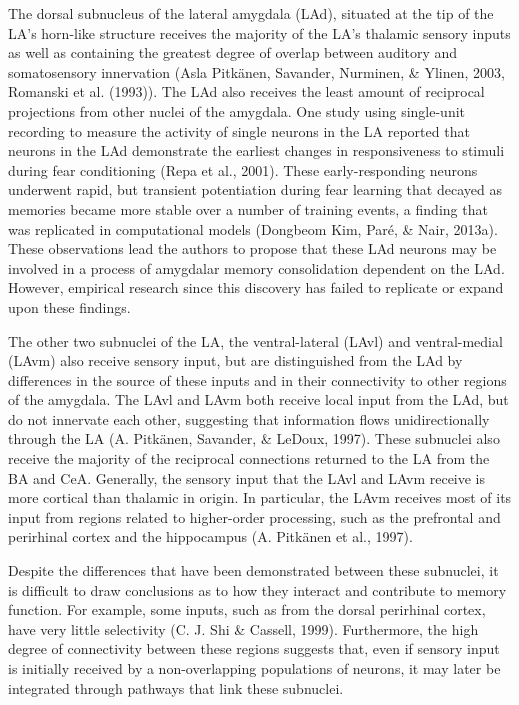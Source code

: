 \documentclass[12pt,a4paperpaper,]{report}
\begin{document}
The dorsal subnucleus of the lateral amygdala (LAd), situated at the tip
of the LA's horn-like structure receives the majority of the LA's
thalamic sensory inputs as well as containing the greatest degree of
overlap between auditory and somatosensory innervation (Asla Pitkänen,
Savander, Nurminen, \& Ylinen, 2003, Romanski et al. (1993)). The LAd
also receives the least amount of reciprocal projections from other
nuclei of the amygdala. One study using single-unit recording to measure
the activity of single neurons in the LA reported that neurons in the
LAd demonstrate the earliest changes in responsiveness to stimuli during
fear conditioning (Repa et al., 2001). These early-responding neurons
underwent rapid, but transient potentiation during fear learning that
decayed as memories became more stable over a number of training events,
a finding that was replicated in computational models (Dongbeom Kim,
Paré, \& Nair, 2013a). These observations lead the authors to propose
that these LAd neurons may be involved in a process of amygdalar memory
consolidation dependent on the LAd. However, empirical research since
this discovery has failed to replicate or expand upon these findings.

The other two subnuclei of the LA, the ventral-lateral (LAvl) and
ventral-medial (LAvm) also receive sensory input, but are distinguished
from the LAd by differences in the source of these inputs and in their
connectivity to other regions of the amygdala. The LAvl and LAvm both
receive local input from the LAd, but do not innervate each other,
suggesting that information flows unidirectionally through the LA (A.
Pitkänen, Savander, \& LeDoux, 1997). These subnuclei also receive the
majority of the reciprocal connections returned to the LA from the BA
and CeA. Generally, the sensory input that the LAvl and LAvm receive is
more cortical than thalamic in origin. In particular, the LAvm receives
most of its input from regions related to higher-order processing, such
as the prefrontal and perirhinal cortex and the hippocampus (A. Pitkänen
et al., 1997).

Despite the differences that have been demonstrated between these
subnuclei, it is difficult to draw conclusions as to how they interact
and contribute to memory function. For example, some inputs, such as
from the dorsal perirhinal cortex, have very little selectivity (C. J.
Shi \& Cassell, 1999). Furthermore, the high degree of connectivity
between these regions suggests that, even if sensory input is initially
received by a non-overlapping populations of neurons, it may later be
integrated through pathways that link these subnuclei.
\end{document}

